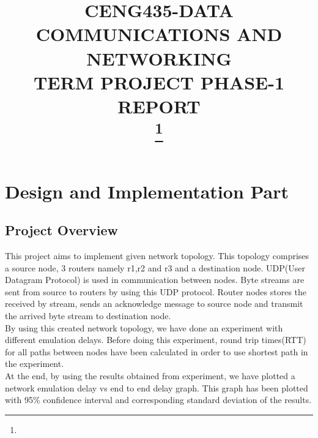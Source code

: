 \documentclass[conference]{IEEEtran}
\begin{document}
\title{CENG435-DATA COMMUNICATIONS AND NETWORKING \\ TERM PROJECT PHASE-1 \\ REPORT \\
{\footnotesize}
\thanks{}
}

\author{
\and
{}
}

\maketitle

\section{Design and Implementation Part}
\subsection{Project Overview}
This project aims to implement given network topology. This topology comprises a source node, 3 routers namely r1,r2 and r3 and a destination node. UDP(User Datagram Protocol) is used in communication between nodes. Byte streams are sent from source to routers by using this UDP protocol. Router nodes stores the received by stream, sends an acknowledge message to source node and transmit the arrived byte stream to destination node. \\
By using this created network topology, we have done an experiment with different emulation delays. Before doing this experiment, round trip times(RTT) for all  paths between nodes have been calculated in order to use shortest path in the experiment.\\
At the end, by using the results obtained from experiment, we have plotted a network emulation delay vs end to end delay graph. This graph has been plotted with 95\% confidence interval and corresponding standard deviation of the results.\\ 
\end{document}
